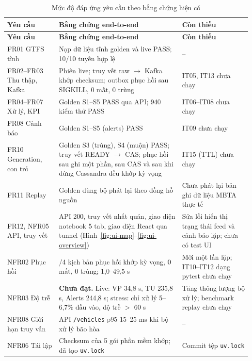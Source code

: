 \begingroup\tablefont
\begin{longtable}{p{3.49cm}p{6.40cm}p{5.24cm}}
\caption{Mức độ đáp ứng yêu cầu theo bằng chứng hiện có} \label{tab:status} \\
\toprule
\textbf{Yêu cầu} & \textbf{Bằng chứng end-to-end} & \textbf{Còn thiếu} \\
\midrule
\endfirsthead
\toprule
\textbf{Yêu cầu} & \textbf{Bằng chứng end-to-end} & \textbf{Còn thiếu} \\
\midrule
\endhead
{\tablefont FR01 GTFS tĩnh} & {\tablefont Nạp dữ liệu tĩnh golden và live PASS; 10/10 tuyến hợp lệ} & {\tablefont --} \\
{\tablefont FR02--FR03 Thu thập, Kafka} & {\tablefont Phiên live; truy vết raw $\rightarrow$ Kafka khớp checksum; outbox phục hồi sau SIGKILL, 0 mất, 0 trùng} & {\tablefont IT05, IT13 chưa chạy} \\
{\tablefont FR04--FR07 Xử lý, KPI} & {\tablefont Golden S1--S5 PASS qua API; 940 kiểm thử PASS} & {\tablefont IT06--IT08 chưa chạy} \\
{\tablefont FR08 Cảnh báo} & {\tablefont Golden S1--S5 (alerts) PASS} & {\tablefont IT09 chưa chạy} \\
{\tablefont FR10 Generation, con trỏ} & {\tablefont Golden S3 (trùng), S4 (muộn) PASS; truy vết READY $\rightarrow$ CAS; phục hồi sau ghi một phần, sau CAS và sau khi dừng Cassandra đều khớp kỳ vọng} & {\tablefont IT15 (TTL) chưa chạy} \\
{\tablefont FR11 Replay} & {\tablefont Golden dùng bộ phát lại theo đồng hồ nguồn} & {\tablefont Chưa phát lại bản ghi dữ liệu MBTA thực tế} \\
{\tablefont FR12, NFR05 API, truy vết} & {\tablefont API 200, truy vết nhất quán, giao diện notebook 5 tab, giao diện React qua tunnel (Hình~\ref{fig:ui-map}--\ref{fig:ui-overview})} & {\tablefont Sửa lỗi hiển thị trạng thái feed và cảnh báo lặp; chưa có test UI} \\
{\tablefont NFR02 Phục hồi} & {\tablefont 4/4 kịch bản phục hồi khớp kỳ vọng, 0 mất, 0 trùng; 1,0--49,5 s} & {\tablefont Mới một lần lặp; IT10--IT12 dạng pytest chưa chạy} \\
{\tablefont NFR03 Độ trễ} & {\tablefont \textbf{Chưa đạt.} Live: VP 34,8 s, TU 235,8 s, Alerts 244,8 s; stress: chỉ xử lý 5--6,7\% đầu vào, độ trễ $>$ 60 s} & {\tablefont Tăng thông lượng bộ xử lý; benchmark replay chưa chạy} \\
{\tablefont NFR08 Giới hạn truy vấn} & {\tablefont API \texttt{/vehicles} p95 15--25 ms khi bộ xử lý bão hòa} & {\tablefont --} \\
{\tablefont NFR06 Tái lập} & {\tablefont Checksum của 5 gói phần mềm khớp; đã tạo \texttt{uv.lock}} & {\tablefont Commit tệp \texttt{uv.lock}} \\
\bottomrule
\end{longtable}
\endgroup
